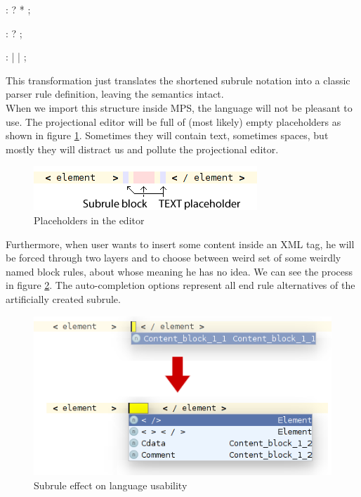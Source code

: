 \begin{antlr}
	          :   ? * ;
	
	 :    ?
	                 ;
	                 
	 :   
	                 |   
	                 |   
	                 ;		
\end{antlr}

This transformation just translates the shortened subrule notation into a classic parser rule definition, leaving the semantics intact.
\\

When we import this structure inside MPS, the language will not be pleasant to use.
The projectional editor will be full of (most likely) empty  placeholders as shown in figure \ref{fig:text_placeholders}.
Sometimes they will contain text, sometimes spaces, but mostly they will distract us and pollute the projectional editor.

\begin{figure}[h]
	\centering
	\includegraphics[scale=0.75]{./img/text_placeholders.png}
	\caption{Placeholders in the editor}
	\label{fig:text_placeholders}
\end{figure}

Furthermore, when user wants to insert some content inside an XML tag, he will be forced through two layers and to choose between weird set of some weirdly named block rules, about whose meaning he has no idea.
We can see the process in figure \ref{fig:subrule_problem}.
The auto-completion options represent all end rule alternatives of the artificially created  subrule.
\\

\begin{figure}[h]
	\centering
	\includegraphics[scale=0.75]{./img/subrule_problem.png}
	\caption{Subrule effect on language usability}
	\label{fig:subrule_problem}
\end{figure}

